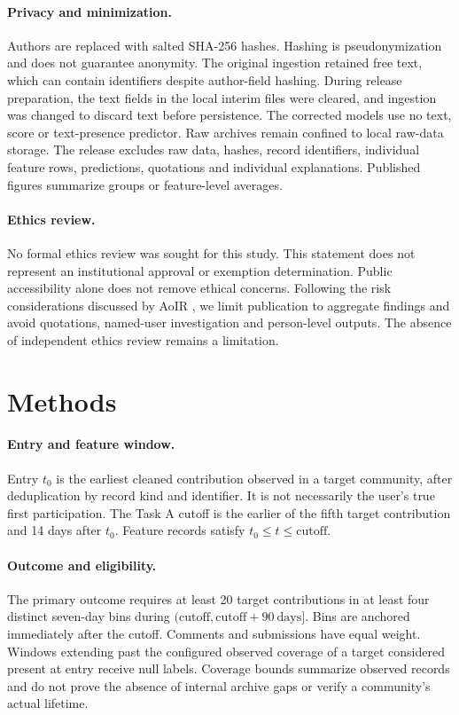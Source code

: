 \documentclass[10pt,twocolumn]{article}
\begin{document}
\paragraph{Privacy and minimization.} Authors are replaced with salted SHA-256 hashes. Hashing is pseudonymization and does not guarantee anonymity. The original ingestion retained free text, which can contain identifiers despite author-field hashing. During release preparation, the text fields in the local interim files were cleared, and ingestion was changed to discard text before persistence. The corrected models use no text, score or text-presence predictor. Raw archives remain confined to local raw-data storage. The release excludes raw data, hashes, record identifiers, individual feature rows, predictions, quotations and individual explanations. Published figures summarize groups or feature-level averages.

\paragraph{Ethics review.} No formal ethics review was sought for this study. This statement does not represent an institutional approval or exemption determination. Public accessibility alone does not remove ethical concerns. Following the risk considerations discussed by AoIR \cite{aoir2020}, we limit publication to aggregate findings and avoid quotations, named-user investigation and person-level outputs. The absence of independent ethics review remains a limitation.

\section{Methods}
\paragraph{Entry and feature window.} Entry $t_0$ is the earliest cleaned contribution observed in a target community, after deduplication by record kind and identifier. It is not necessarily the user's true first participation. The Task A cutoff is the earlier of the fifth target contribution and 14 days after $t_0$. Feature records satisfy $t_0\leq t\leq\mathrm{cutoff}$.

\paragraph{Outcome and eligibility.} The primary outcome requires at least 20 target contributions in at least four distinct seven-day bins during $(\mathrm{cutoff},\mathrm{cutoff}+90\ \mathrm{days}]$. Bins are anchored immediately after the cutoff. Comments and submissions have equal weight. Windows extending past the configured observed coverage of a target considered present at entry receive null labels. Coverage bounds summarize observed records and do not prove the absence of internal archive gaps or verify a community's actual lifetime.
\end{document}
